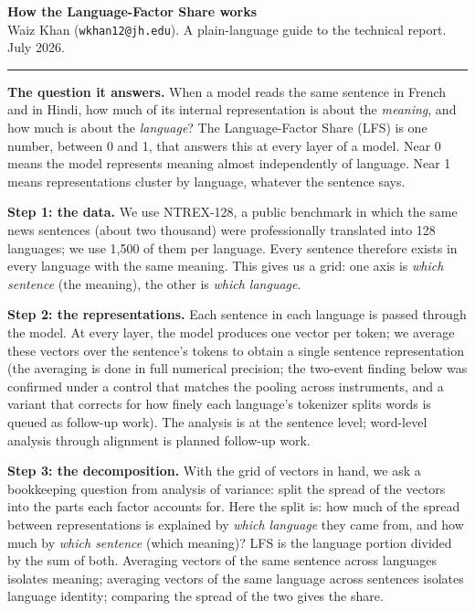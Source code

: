 \documentclass[11pt,a4paper]{article}
\begin{document}
{\LARGE \textbf{How the Language-Factor Share works}}\\[1.5mm]
{\small Waiz Khan (\texttt{wkhan12@jh.edu}). A plain-language guide to
the technical report. July 2026.}

\vspace{1mm}\hrule\vspace{3mm}

\textbf{The question it answers.} When a model reads the same sentence in
French and in Hindi, how much of its internal representation is about the
\emph{meaning}, and how much is about the \emph{language}? The
Language-Factor Share (LFS) is one number, between 0 and 1, that answers
this at every layer of a model. Near 0 means the model represents meaning
almost independently of language. Near 1 means representations cluster by
language, whatever the sentence says.

\textbf{Step 1: the data.} We use NTREX-128, a public benchmark in which
the same news sentences (about two thousand) were professionally
translated into 128 languages; we use 1{,}500 of them per language. Every sentence therefore exists in every language with the same
meaning. This gives us a grid: one axis is \emph{which sentence} (the
meaning), the other is \emph{which language}.

\textbf{Step 2: the representations.} Each sentence in each language is
passed through the model. At every layer, the model produces one vector per
token; we average these vectors over the sentence's tokens to obtain a
single sentence representation (the averaging is done in full numerical
precision; the two-event finding below was confirmed under a control that
matches the pooling across instruments, and a variant that corrects for
how finely each language's tokenizer splits words is queued as follow-up
work). The analysis is at the sentence level; word-level analysis through
alignment is planned follow-up work.

\textbf{Step 3: the decomposition.} With the grid of vectors in hand, we ask a bookkeeping question from analysis of variance: split the spread of the vectors into the parts each factor accounts for. Here the split is: how much of the spread between
representations is explained by \emph{which language} they came from, and
how much by \emph{which sentence} (which meaning)? LFS is the language
portion divided by the sum of both. Averaging vectors of the same sentence
across languages isolates meaning; averaging vectors of the same language
across sentences isolates language identity; comparing the spread of the
two gives the share.
\end{document}
